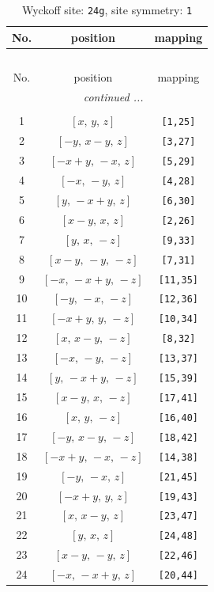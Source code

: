 \documentclass[fleqn,8pt]{jsarticle}
\begin{document}
\begin{longtable}{ccc}
\caption{Wyckoff site: {\tt 24g}, site symmetry: {\tt 1}}
 \\
 \hline \hline
No. & position & mapping \\ \hline \endfirsthead

\multicolumn{2}{l}{\tablename\ \thetable{}} \\
 \hline \hline
No. & position & mapping \\ \hline \endhead

 \hline \hline
\multicolumn{2}{r}{\footnotesize\it continued ...} \\ \endfoot

 \hline \hline
\multicolumn{2}{r}{} \\ \endlastfoot

1 & $\left[ x,\, y,\, z \right]$ & {\tt [1,25]} \\ \hline
2 & $\left[ - y,\, x - y,\, z \right]$ & {\tt [3,27]} \\ \hline
3 & $\left[ - x + y,\, - x,\, z \right]$ & {\tt [5,29]} \\ \hline
4 & $\left[ - x,\, - y,\, z \right]$ & {\tt [4,28]} \\ \hline
5 & $\left[ y,\, - x + y,\, z \right]$ & {\tt [6,30]} \\ \hline
6 & $\left[ x - y,\, x,\, z \right]$ & {\tt [2,26]} \\ \hline
7 & $\left[ y,\, x,\, - z \right]$ & {\tt [9,33]} \\ \hline
8 & $\left[ x - y,\, - y,\, - z \right]$ & {\tt [7,31]} \\ \hline
9 & $\left[ - x,\, - x + y,\, - z \right]$ & {\tt [11,35]} \\ \hline
10 & $\left[ - y,\, - x,\, - z \right]$ & {\tt [12,36]} \\ \hline
11 & $\left[ - x + y,\, y,\, - z \right]$ & {\tt [10,34]} \\ \hline
12 & $\left[ x,\, x - y,\, - z \right]$ & {\tt [8,32]} \\ \hline
13 & $\left[ - x,\, - y,\, - z \right]$ & {\tt [13,37]} \\ \hline
14 & $\left[ y,\, - x + y,\, - z \right]$ & {\tt [15,39]} \\ \hline
15 & $\left[ x - y,\, x,\, - z \right]$ & {\tt [17,41]} \\ \hline
16 & $\left[ x,\, y,\, - z \right]$ & {\tt [16,40]} \\ \hline
17 & $\left[ - y,\, x - y,\, - z \right]$ & {\tt [18,42]} \\ \hline
18 & $\left[ - x + y,\, - x,\, - z \right]$ & {\tt [14,38]} \\ \hline
19 & $\left[ - y,\, - x,\, z \right]$ & {\tt [21,45]} \\ \hline
20 & $\left[ - x + y,\, y,\, z \right]$ & {\tt [19,43]} \\ \hline
21 & $\left[ x,\, x - y,\, z \right]$ & {\tt [23,47]} \\ \hline
22 & $\left[ y,\, x,\, z \right]$ & {\tt [24,48]} \\ \hline
23 & $\left[ x - y,\, - y,\, z \right]$ & {\tt [22,46]} \\ \hline
24 & $\left[ - x,\, - x + y,\, z \right]$ & {\tt [20,44]} \\
\end{longtable}
\end{document}
